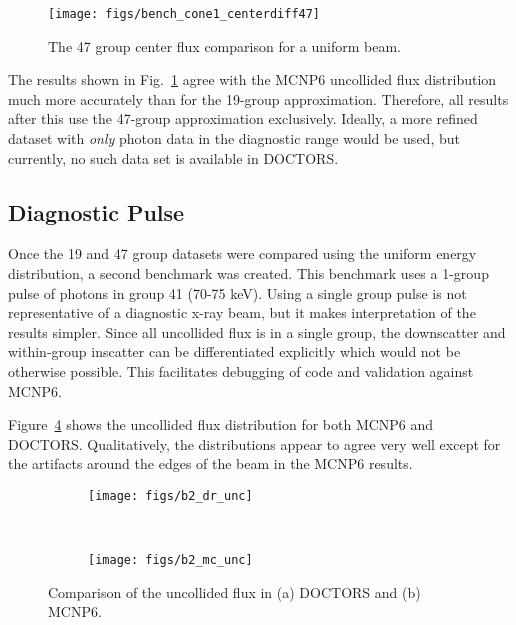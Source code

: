 \begin{figure}[tb]
  \begin{center}
   \texttt{[image: figs/bench\_cone1\_centerdiff47]}
  \end{center}
  \caption{The 47 group center flux comparison for a uniform beam.}
\label{fig:bench_cone1_centerdiff47}
\end{figure}

The results shown in Fig.~\ref{fig:bench_cone1_centerdiff47} agree with the MCNP6 uncollided flux distribution much more accurately than for the 19-group approximation. Therefore, all results after this use the 47-group approximation exclusively. Ideally, a more refined dataset with \textit{only} photon data in the diagnostic range would be used, but currently, no such data set is available in DOCTORS.

\subsection{Diagnostic Pulse}
Once the 19 and 47 group datasets were compared using the uniform energy distribution, a second benchmark was created. This benchmark uses a 1-group pulse of photons in group 41 (70-75 keV). Using a single group pulse is not representative of a diagnostic x-ray beam, but it makes interpretation of the results simpler. Since all uncollided flux is in a single group, the downscatter and within-group inscatter can be differentiated explicitly which would not be otherwise possible. This facilitates debugging of code and validation against MCNP6.

Figure~\ref{fig:b2_unc} shows the uncollided flux distribution for both MCNP6 and DOCTORS. Qualitatively, the distributions appear to agree very well except for the artifacts around the edges of the beam in the MCNP6 results.


\begin{figure}
    \centering
    \begin{subfigure}[b]{0.45\textwidth}
        \texttt{[image: figs/b2\_dr\_unc]}
        \caption{}
        \label{fig:bench_cone1_centerdiff}
    \end{subfigure}
    ~
    \begin{subfigure}[b]{0.45\textwidth}
        \texttt{[image: figs/b2\_mc\_unc]}
        \caption{}
        \label{fig:bench_cone1_centerdiff2}
    \end{subfigure}
    \caption{Comparison of the uncollided flux in (a) DOCTORS and (b) MCNP6. }\label{fig:b2_unc}
\end{figure}

